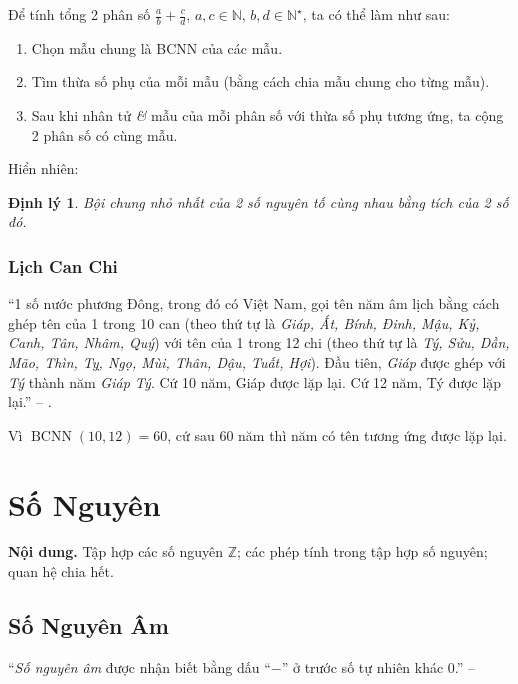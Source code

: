 \documentclass{article}
\numberwithin{equation}{section}
\newtheorem{theorem}{Định lý}[section]
\begin{document}
\begin{tcolorbox}
	Để tính tổng 2 phân số $\frac{a}{b} + \frac{c}{d}$, $a,c\in\mathbb{N}$, $b,d\in\mathbb{N}^\star$, ta có thể làm như sau:
	\begin{enumerate}
		\item Chọn mẫu chung là BCNN của các mẫu.
		\item Tìm thừa số phụ của mỗi mẫu (bằng cách chia mẫu chung cho từng mẫu).
		\item Sau khi nhân tử \textit{\&} mẫu của mỗi phân số với thừa số phụ tương ứng, ta cộng 2 phân số có cùng mẫu.
	\end{enumerate}
\end{tcolorbox}
Hiển nhiên:

\begin{theorem}
	Bội chung nhỏ nhất của 2 số nguyên tố cùng nhau bằng tích của 2 số đó.
\end{theorem}

\subsubsection{Lịch Can Chi}
``1 số nước phương Đông, trong đó có Việt Nam, gọi tên năm âm lịch bằng cách ghép tên của 1 trong 10 can (theo thứ tự là \textit{Giáp, Ất, Bính, Đinh, Mậu, Kỷ, Canh, Tân, Nhâm, Quý}) với tên của 1 trong 12 chi (theo thứ tự là \textit{Tý, Sửu, Dần, Mão, Thìn, Tỵ, Ngọ, Mùi, Thân, Dậu, Tuất, Hợi}). Đầu tiên, \textit{Giáp} được ghép với \textit{Tý} thành năm \textit{Giáp Tý}. Cứ 10 năm, Giáp được lặp lại. Cứ 12 năm, Tý được lặp lại.'' -- \cite[p. 58]{Thai_Anh_Dat_Ha_Loan_Nam_Quang_Toan_6_tap_1}.

Vì $\operatorname{BCNN}(10,12) = 60$, cứ sau 60 năm thì năm có tên tương ứng được lặp lại.


\section{Số Nguyên}
\textbf{Nội dung.} Tập hợp các số nguyên $\mathbb{Z}$; các phép tính trong tập hợp số nguyên; quan hệ chia hết.

\subsection{Số Nguyên Âm}
``\emph{Số nguyên âm} được nhận biết bằng dấu ``$-$'' ở trước số tự nhiên khác 0.'' -- \cite[p. 61]{Thai_Anh_Dat_Ha_Loan_Nam_Quang_Toan_6_tap_1}
\end{document}
